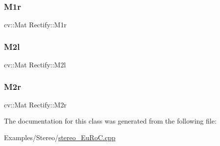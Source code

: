 \mbox{\label{class_rectify_a38bed768da331d8097e03b4cb9c6c96e}} 
\subsubsection{\texorpdfstring{M1r}{M1r}}
{\footnotesize\ttfamily cv\+::\+Mat Rectify\+::\+M1r}

\mbox{\label{class_rectify_a5b6d2e9cf6d4e5db0ca0f75247fdb120}} 
\subsubsection{\texorpdfstring{M2l}{M2l}}
{\footnotesize\ttfamily cv\+::\+Mat Rectify\+::\+M2l}

\mbox{\label{class_rectify_a57ade3e3cb60f17a6fae8095fd79bc6c}} 
\subsubsection{\texorpdfstring{M2r}{M2r}}
{\footnotesize\ttfamily cv\+::\+Mat Rectify\+::\+M2r}



The documentation for this class was generated from the following file\+:\begin{DoxyCompactItemize}
\item 
Examples/\+Stereo/\mbox{\hyperlink{stereo___eu_ro_c_8cpp}{stereo\+\_\+\+Eu\+Ro\+C.\+cpp}}\end{DoxyCompactItemize}
